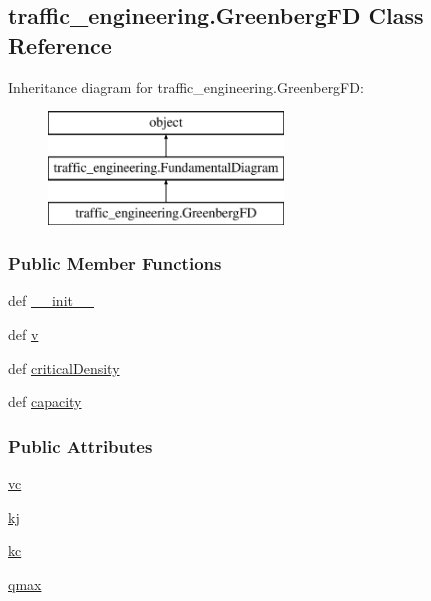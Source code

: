 \hypertarget{classtraffic__engineering_1_1GreenbergFD}{\subsection{traffic\-\_\-engineering.\-Greenberg\-F\-D Class Reference}
\label{classtraffic__engineering_1_1GreenbergFD}
}
Inheritance diagram for traffic\-\_\-engineering.\-Greenberg\-F\-D\-:\begin{figure}[H]
\begin{center}
\leavevmode
\includegraphics[height=3.000000cm]{classtraffic__engineering_1_1GreenbergFD}
\end{center}
\end{figure}
\subsubsection*{Public Member Functions}
\begin{DoxyCompactItemize}
\item 
def \hyperlink{classtraffic__engineering_1_1GreenbergFD_a514f0f2687de708e1badc7ec11a1a1ec}{\-\_\-\-\_\-init\-\_\-\-\_\-}
\item 
def \hyperlink{classtraffic__engineering_1_1GreenbergFD_aa63b3b26baa44f1ee5d6a8dc84b8baa3}{v}
\item 
def \hyperlink{classtraffic__engineering_1_1GreenbergFD_a23fb323e718ad56acae0f174a465c90c}{critical\-Density}
\item 
def \hyperlink{classtraffic__engineering_1_1GreenbergFD_a8acd2a1a27936fb5be6ae8049cbe9711}{capacity}
\end{DoxyCompactItemize}
\subsubsection*{Public Attributes}
\begin{DoxyCompactItemize}
\item 
\hyperlink{classtraffic__engineering_1_1GreenbergFD_a7134c8a55120d951b112818fe9724285}{vc}
\item 
\hyperlink{classtraffic__engineering_1_1GreenbergFD_ac4c696e59088247b4ede81c4d89e9175}{kj}
\item 
\hyperlink{classtraffic__engineering_1_1GreenbergFD_ae1655c5902b4a0a052076c1f3cf9815f}{kc}
\item 
\hyperlink{classtraffic__engineering_1_1GreenbergFD_ae75ead70e12104991e35ac8e81c9257e}{qmax}
\end{DoxyCompactItemize}
